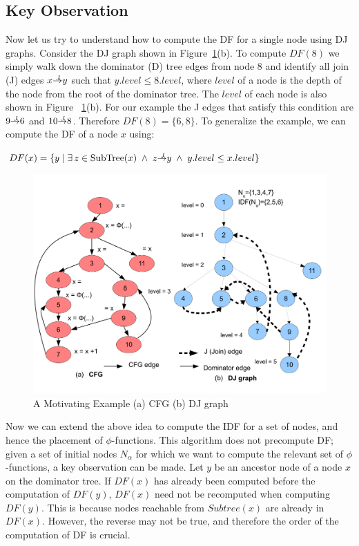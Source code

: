 {\subsection{Key Observation} 
 
Now let us try to understand how to compute the DF for a single node using DJ graphs. 
Consider  the DJ graph shown in Figure~\ref{fig:cfg}(b). To compute $DF(8)$ we simply walk down the
dominator (D) tree edges from node 8 and identify all join (J) edges $x \st{J} y$ such
that $y.level \leq 8.level$, where $level$ of a node is the depth of the node from the
root of the dominator tree. The $level$ of each node is also shown in Figure ~\ref{fig:cfg}(b).
For our example the J edges that satisfy this 
condition are $9 \st{J} 6$ and $10 \st{J} 8$. Therefore $DF(8) = \{6, 8\}$. To generalize the example, we can
compute the DF of a node $x$ using:
\begin{center}
  $DF(x) = \{y\mid\exists\, z \in {\rm SubTree}(x) \; \wedge \; z \st{J} y \; \wedge \; y.level \leq x.level \}$
\end{center}

    \begin{figure}[htb]
    \centerline{\includegraphics[scale=0.4]{cfglive_new.pdf}}
    \caption{A Motivating Example (a) CFG (b) DJ graph}
    \label{fig:cfg}
    \end{figure} 

Now we can extend the above idea to compute the IDF for a set of nodes, and 
hence the placement of $\phi$-functions. This algorithm does not precompute DF; given a set of initial nodes $N_{\alpha}$ for which we want to compute the relevant set of $\phi$-functions,
a key observation can be made. Let $y$ be an ancestor node of a node $x$ on the dominator tree. If $DF(x)$ has already been computed before the computation of $DF(y)$,  $DF(x)$ need not
be recomputed when computing $DF(y)$. This is because nodes reachable from $Subtree(x)$ are already in $DF(x)$. However, the reverse may not be true, and  therefore the order of the computation of DF is crucial.

}

